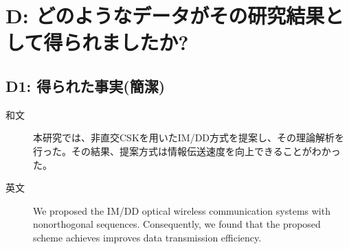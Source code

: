 ﻿\documentclass[a4j,10pt]{jarticle}
\begin{document}
\section{D: どのようなデータがその研究結果として得られましたか?}
\subsection{D1: 得られた事実(簡潔)} %
\begin{description} 
 \item[和文] 本研究では、非直交CSKを用いたIM/DD方式を提案し、その理論解析を行った。その結果、提案方式は情報伝送速度を向上できることがわかった。

%
 \item[英文] We proposed the IM/DD optical wireless communication systems with nonorthogonal sequences. Consequently, we found that the proposed scheme achieves improves data transmission efficiency. 

\end{description}
%
\end{document}
